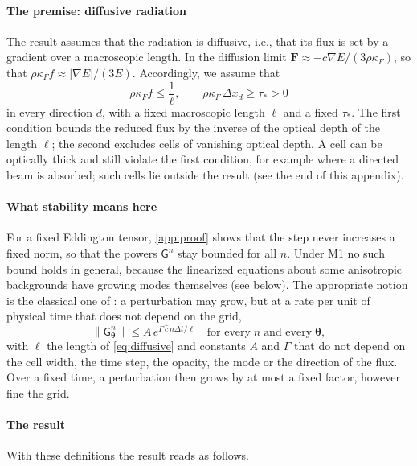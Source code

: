 \documentclass[preprint,12pt,authoryear]{elsarticle}
\newcommand{\vecF}{\mathbf{F}}
\newcommand{\tenG}{\mathsf{G}}
\begin{document}
\begin{appendix}
\paragraph{The premise: diffusive radiation} The result assumes that the radiation is diffusive, i.e., that its flux is set by a gradient over a macroscopic length. In the diffusion limit $\vecF \approx -c\nabla E/(3\rho\kappa_F)$, so that $\rho\kappa_F f \approx |\nabla E|/(3E)$. Accordingly, we assume that
\begin{equation}
    \rho\kappa_F f \leq \frac{1}{\ell},
    \qquad
    \rho\kappa_F\,\Delta x_d \geq \tau_* > 0
    \label{eq:diffusive}
\end{equation}
in every direction $d$, with a fixed macroscopic length $\ell$ and a fixed $\tau_*$. The first condition bounds the reduced flux by the inverse of the optical depth of the length $\ell$; the second excludes cells of vanishing optical depth. A cell can be optically thick and still violate the first condition, for example where a directed beam is absorbed; such cells lie outside the result (see the end of this appendix).

\paragraph{What stability means here} For a fixed Eddington tensor, \ref{app:proof} shows that the step never increases a fixed norm, so that the powers $\tenG^n$ stay bounded for all $n$. Under M1 no such bound holds in general, because the linearized equations about some anisotropic backgrounds have growing modes themselves (see below). The appropriate notion is the classical one of \citet{Lax56a}: a perturbation may grow, but at a rate per unit of physical time that does not depend on the grid,
\begin{equation}
    \left\|\tenG_{\boldsymbol{\theta}}^n\right\| \leq A\, e^{\Gamma\,\hat{c}\,n\Delta t/\ell} \quad \mbox{for every}\; n \;\mbox{and every}\; \boldsymbol{\theta},
    \label{eq:finite_time}
\end{equation}
with $\ell$ the length of \autoref{eq:diffusive} and constants $A$ and $\Gamma$ that do not depend on the cell width, the time step, the opacity, the mode or the direction of the flux. Over a fixed time, a perturbation then grows by at most a fixed factor, however fine the grid.

\paragraph{The result} With these definitions the result reads as follows.


\end{appendix}
\end{document}
